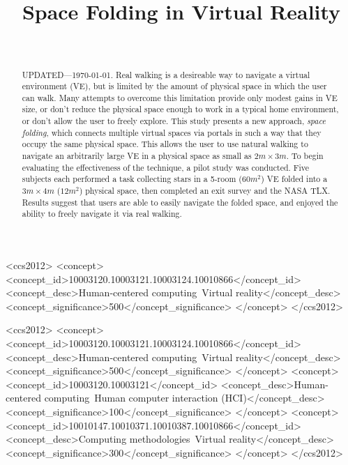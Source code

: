 \documentclass{sigchi}
\def\plaintitle{Space Folding in Virtual Reality}
\begin{document}
\title{\plaintitle}

\author{%
  \\
}

\maketitle

\begin{abstract}
  UPDATED---\today. Real walking is a desireable way to navigate a virtual environment (VE), but is limited by the amount of physical space in which the user can walk.  Many attempts to overcome this limitation provide only modest gains in VE size, or don’t reduce the physical space enough to work in a typical home environment, or don’t allow the user to freely explore.  This study presents a new approach, \textit{space folding}, which connects multiple virtual spaces via portals in such a way that they occupy the same physical space.  This allows the user to use natural walking to navigate an arbitrarily large VE in a physical space as small as $2 m \times 3 m$.  To begin evaluating the effectiveness of the technique, a pilot study was conducted.  Five subjects each performed a task collecting stars in a 5-room ($60 m^2$) VE folded into a $3 m \times 4 m$ ($12 m^2$) physical space, then completed an exit survey and the NASA TLX.  Results suggest that users are able to easily navigate the folded space, and enjoyed the ability to freely navigate it via real walking.
\end{abstract}



\begin{CCSXML}
<ccs2012>
<concept>
<concept_id>10003120.10003121.10003124.10010866</concept_id>
<concept_desc>Human-centered computing~Virtual reality</concept_desc>
<concept_significance>500</concept_significance>
</concept>
</ccs2012>
\end{CCSXML}



\begin{CCSXML}
<ccs2012>
<concept>
<concept_id>10003120.10003121.10003124.10010866</concept_id>
<concept_desc>Human-centered computing~Virtual reality</concept_desc>
<concept_significance>500</concept_significance>
</concept>
<concept>
<concept_id>10003120.10003121</concept_id>
<concept_desc>Human-centered computing~Human computer interaction (HCI)</concept_desc>
<concept_significance>100</concept_significance>
</concept>
<concept>
<concept_id>10010147.10010371.10010387.10010866</concept_id>
<concept_desc>Computing methodologies~Virtual reality</concept_desc>
<concept_significance>300</concept_significance>
</concept>
</ccs2012>
\end{CCSXML}
\end{document}
